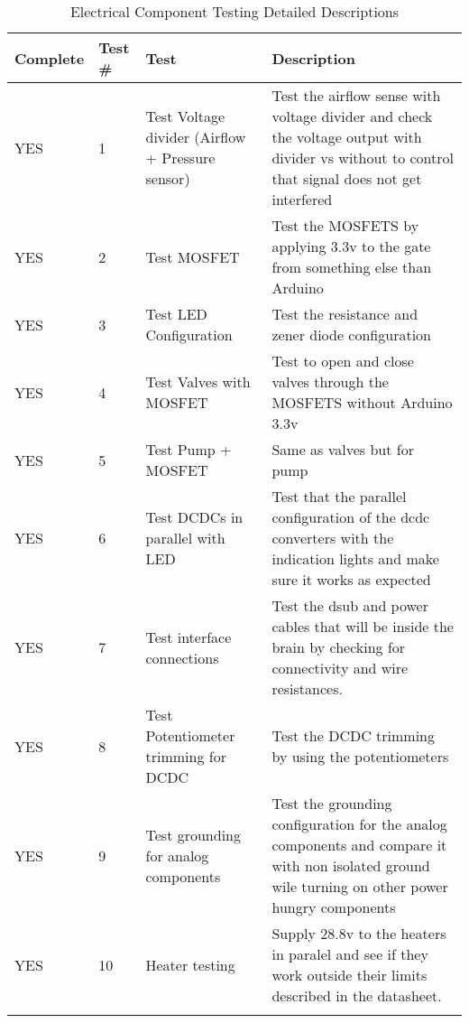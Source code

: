
\begin{longtable}{|m{}|m{}|m{}|m{}|}
\hline
Complete & Test \# & Test & Description \\ \hline
YES & 1 & Test Voltage divider (Airflow + Pressure sensor) & Test the airflow sense with voltage divider and check the voltage output with divider vs without to control that signal does not get interfered \\ \hline
YES & 2 & Test MOSFET & Test the MOSFETS by applying 3.3v to the gate from something else than Arduino \\ \hline
YES & 3 & Test LED Configuration & Test the resistance and zener diode configuration\\ \hline
YES & 4 & Test Valves with MOSFET & Test to open and close valves through the MOSFETS without Arduino 3.3v  \\ \hline
YES & 5 & Test Pump + MOSFET & Same as valves but for pump  \\ \hline
YES & 6 & Test DCDCs in parallel with LED & Test that the parallel configuration of the dcdc converters with the indication lights and make sure it works as expected  \\ \hline
YES & 7 & Test interface connections & Test the dsub and power cables that will be inside the brain by checking for connectivity and wire resistances.  \\ \hline
YES & 8 & Test Potentiometer trimming for DCDC & Test the DCDC trimming by using the potentiometers \\ \hline
YES & 9 & Test grounding for analog components & Test the grounding configuration for the analog components and compare it with non isolated ground wile turning on other power hungry components \\ \hline
YES & 10 & Heater testing & Supply 28.8v to the heaters in paralel and see if they work outside their limits described in the datasheet. \\ \hline
\caption{Electrical Component Testing Detailed Descriptions}
\label{tab:test33-result-electrical-component}
\end{longtable}